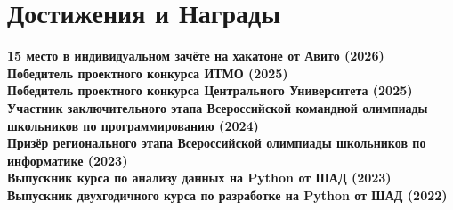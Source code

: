 \documentclass[letterpaper,11pt]{article}
\newcommand{\resumeSubHeadingListStart}{\begin{itemize}[leftmargin=0.15in, label={}]}
\newcommand{\resumeSubHeadingListEnd}{\end{itemize}}
\begin{document}
\section{Достижения и Награды}
  \vspace{2pt}
  \resumeSubHeadingListStart
    \small{\item{
        \textbf{15 место в индивидуальном зачёте на хакатоне от Авито (2026)} \\ \vspace{3pt}
        \textbf{Победитель проектного конкурса ИТМО (2025)} \\ \vspace{3pt}
        \textbf{Победитель проектного конкурса Центрального Университета (2025)} \\ \vspace{3pt}
        \textbf{Участник заключительного этапа Всероссийской командной олимпиады школьников по программированию (2024)} \\ \vspace{3pt}
        \textbf{Призёр регионального этапа Всероссийской олимпиады школьников по информатике (2023)} \\ \vspace{3pt}
        \textbf{Выпускник курса по анализу данных на Python от ШАД (2023)} \\ \vspace{3pt}
        \textbf{Выпускник двухгодичного курса по разработке на Python от ШАД (2022)}
    }}
  \resumeSubHeadingListEnd

\end{document}
